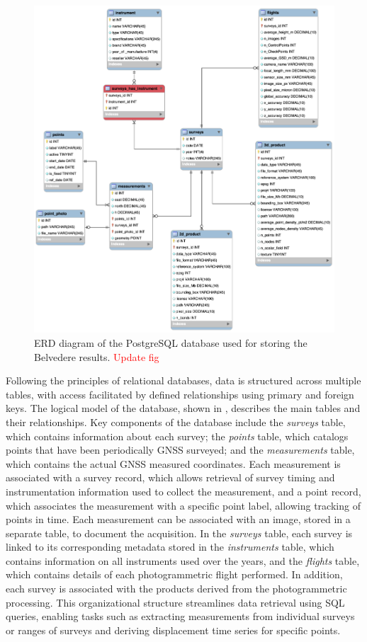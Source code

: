 \begin{figure}[ht!]
  \centering
  \includegraphics[width=\textwidth]{belvederedb_erd.png}
  \caption{ERD diagram of the PostgreSQL database used for storing the Belvedere results. \textcolor{red}{Update fig}}
  \label{fig:3:belvederedb_erd}
\end{figure}

Following the principles of relational databases, data is structured across multiple tables, with access facilitated by defined relationships using primary and foreign keys. 
The logical model of the database, shown in , describes the main tables and their relationships.
Key components of the database include the \textit{surveys} table, which contains information about each survey; the \textit{points} table, which catalogs points that have been periodically GNSS surveyed; and the \textit{measurements} table, which contains the actual GNSS measured coordinates. 
Each measurement is associated with a survey record, which allows retrieval of survey timing and instrumentation information used to collect the measurement, and a point record, which associates the measurement with a specific point label, allowing tracking of points in time.
Each measurement can be associated with an image, stored in a separate table, to document the acquisition.
In the \textit{surveys} table, each survey is linked to its corresponding metadata stored in the \textit{instruments} table, which contains information on all instruments used over the years, and the \textit{flights} table, which contains details of each photogrammetric flight performed.
In addition, each survey is associated with the products derived from the photogrammetric processing.
This organizational structure streamlines data retrieval using SQL queries, enabling tasks such as extracting measurements from individual surveys or ranges of surveys and deriving displacement time series for specific points.


